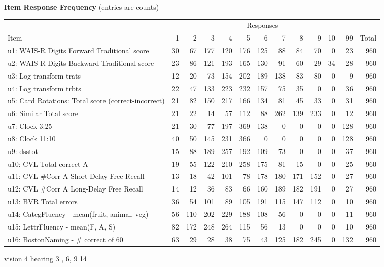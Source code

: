 \begin{center}
{\bf Item Response Frequency} (entries are counts)\\ 
\end{center}
\begin{longtable}{l r r r r r r r r r r r r} 
 & \multicolumn{11}{c}{Responses} \\ 
\cline{2-12}
Item  & 1  & 2  & 3  & 4  & 5  & 6  & 7  & 8  & 9  & 10  & 99  & Total \\ 
\hline
u1: WAIS-R Digits Forward Traditional score& 30& 67& 177& 120& 176& 125& 88& 84& 70& 0& 23& 960 \\
u2: WAIS-R Digits Backward Traditional score& 23& 86& 121& 193& 165& 130& 91& 60& 29& 34& 28& 960 \\
u3: Log transform trats& 12& 20& 73& 154& 202& 189& 138& 83& 80& 0& 9& 960 \\
u4: Log transform trbts& 22& 47& 133& 223& 232& 157& 75& 35& 0& 0& 36& 960 \\
u5: Card Rotations: Total score (correct-incorrect)& 21& 82& 150& 217& 166& 134& 81& 45& 33& 0& 31& 960 \\
u6: Similar Total score& 21& 22& 14& 57& 112& 88& 262& 139& 233& 0& 12& 960 \\
u7: Clock 3:25& 21& 30& 77& 197& 369& 138& 0& 0& 0& 0& 128& 960 \\
u8: Clock 11:10& 40& 50& 145& 231& 366& 0& 0& 0& 0& 0& 128& 960 \\
u9: dsstot  & 15& 88& 189& 257& 192& 109& 73& 0& 0& 0& 37& 960 \\
u10: CVL Total correct A& 19& 55& 122& 210& 258& 175& 81& 15& 0& 0& 25& 960 \\
u11: CVL #Corr A Short-Delay Free Recall& 13& 18& 42& 101& 78& 178& 180& 171& 152& 0& 27& 960 \\
u12: CVL #Corr A Long-Delay Free Recall& 14& 12& 36& 83& 66& 160& 189& 182& 191& 0& 27& 960 \\
u13: BVR Total errors& 36& 54& 101& 89& 105& 191& 115& 147& 112& 0& 10& 960 \\
u14: CategFluency - mean(fruit, animal, veg)& 56& 110& 202& 229& 188& 108& 56& 0& 0& 0& 11& 960 \\
u15: LettrFluency - mean(F, A, S)& 82& 172& 248& 264& 115& 56& 13& 0& 0& 0& 10& 960 \\
u16: BostonNaming - # correct of 60& 63& 29& 28& 38& 75& 43& 125& 182& 245& 0& 132& 960 \\
\hline
\end{longtable}

vision 4 
hearing 3 , 6, 9 14